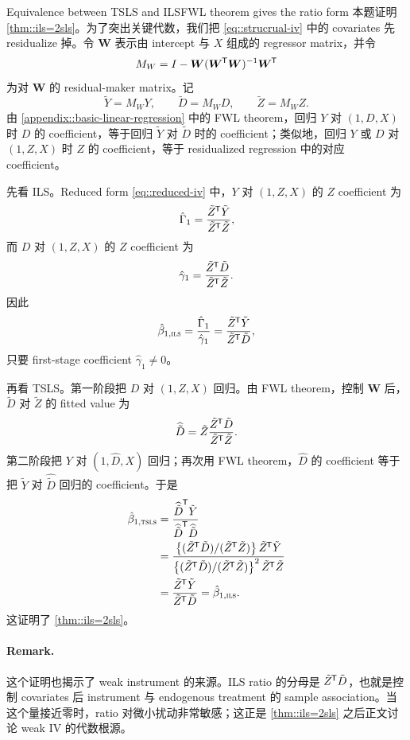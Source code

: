 \begin{exercisesolution}{Equivalence between TSLS and ILS}{FWL theorem gives the ratio form}
本题证明 \cref{thm::ils=2sls}。为了突出关键代数，我们把 \cref{eq::strucrual-iv} 中的 covariates 先 residualize 掉。令 $\boldsymbol{W}$ 表示由 intercept 与 $X$ 组成的 regressor matrix，并令
\[
M_W=I-\boldsymbol{W}(\boldsymbol{W}^{\mkern-1.5mu\mathsf{T}}\boldsymbol{W})^{-1}\boldsymbol{W}^{\mkern-1.5mu\mathsf{T}}
\]
为对 $\boldsymbol{W}$ 的 residual-maker matrix。记
\[
\tilde{Y}=M_WY,\qquad
\tilde{D}=M_WD,\qquad
\tilde{Z}=M_WZ.
\]
由 \cref{appendix::basic-linear-regression} 中的 FWL theorem，回归 $Y$ 对 $(1,D,X)$ 时 $D$ 的 coefficient，等于回归 $\tilde{Y}$ 对 $\tilde{D}$ 时的 coefficient；类似地，回归 $Y$ 或 $D$ 对 $(1,Z,X)$ 时 $Z$ 的 coefficient，等于 residualized regression 中的对应 coefficient。

先看 ILS。Reduced form \cref{eq::reduced-iv} 中，$Y$ 对 $(1,Z,X)$ 的 $Z$ coefficient 为
\[
\hat{\Gamma}_1
=
\frac{\tilde{Z}^{\mkern-1.5mu\mathsf{T}}\tilde{Y}}{\tilde{Z}^{\mkern-1.5mu\mathsf{T}}\tilde{Z}},
\]
而 $D$ 对 $(1,Z,X)$ 的 $Z$ coefficient 为
\[
\hat{\gamma}_1
=
\frac{\tilde{Z}^{\mkern-1.5mu\mathsf{T}}\tilde{D}}{\tilde{Z}^{\mkern-1.5mu\mathsf{T}}\tilde{Z}}.
\]
因此
\[
\hat{\beta}_{1,\textsc{ils}}
=
\frac{\hat{\Gamma}_1}{\hat{\gamma}_1}
=
\frac{\tilde{Z}^{\mkern-1.5mu\mathsf{T}}\tilde{Y}}{\tilde{Z}^{\mkern-1.5mu\mathsf{T}}\tilde{D}},
\]
只要 first-stage coefficient $\hat{\gamma}_1\neq 0$。

再看 TSLS。第一阶段把 $D$ 对 $(1,Z,X)$ 回归。由 FWL theorem，控制 $\boldsymbol{W}$ 后，$\tilde{D}$ 对 $\tilde{Z}$ 的 fitted value 为
\[
\widehat{\tilde{D}}
=
\tilde{Z}\frac{\tilde{Z}^{\mkern-1.5mu\mathsf{T}}\tilde{D}}{\tilde{Z}^{\mkern-1.5mu\mathsf{T}}\tilde{Z}}.
\]
第二阶段把 $Y$ 对 $(1,\hat{D},X)$ 回归；再次用 FWL theorem，$\hat{D}$ 的 coefficient 等于把 $\tilde{Y}$ 对 $\widehat{\tilde{D}}$ 回归的 coefficient。于是
\begin{align*}
\hat{\beta}_{1,\textsc{tsls}}
&=
\frac{\widehat{\tilde{D}}^{\mkern-1.5mu\mathsf{T}}\tilde{Y}}
{\widehat{\tilde{D}}^{\mkern-1.5mu\mathsf{T}}\widehat{\tilde{D}}}  \\
&=
\frac{
\left\{(\tilde{Z}^{\mkern-1.5mu\mathsf{T}}\tilde{D})/(\tilde{Z}^{\mkern-1.5mu\mathsf{T}}\tilde{Z})\right\}
\tilde{Z}^{\mkern-1.5mu\mathsf{T}}\tilde{Y}}
{
\left\{(\tilde{Z}^{\mkern-1.5mu\mathsf{T}}\tilde{D})/(\tilde{Z}^{\mkern-1.5mu\mathsf{T}}\tilde{Z})\right\}^2
\tilde{Z}^{\mkern-1.5mu\mathsf{T}}\tilde{Z}
}  \\
&=
\frac{\tilde{Z}^{\mkern-1.5mu\mathsf{T}}\tilde{Y}}{\tilde{Z}^{\mkern-1.5mu\mathsf{T}}\tilde{D}}
=
\hat{\beta}_{1,\textsc{ils}}.
\end{align*}
这证明了 \cref{thm::ils=2sls}。

\paragraph{Remark.}
这个证明也揭示了 weak instrument 的来源。ILS ratio 的分母是 $\tilde{Z}^{\mkern-1.5mu\mathsf{T}}\tilde{D}$，也就是控制 covariates 后 instrument 与 endogenous treatment 的 sample association。当这个量接近零时，ratio 对微小扰动非常敏感；这正是 \cref{thm::ils=2sls} 之后正文讨论 weak IV 的代数根源。
\end{exercisesolution}

